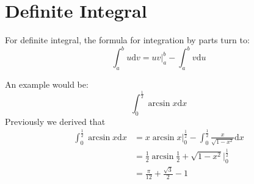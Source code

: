 \documentclass{article}
\numberwithin{equation}{section}
\begin{document}
\newpage
\section{Definite Integral}
For definite integral, the formula for integration by parts turn to:
\[
\int_{a}^{b} u\mathrm{d}v = uv \Big|_a^b - \int_{a}^{b} v\mathrm{d}u
\]

An example would be:
\[
\int_{0}^{\frac{1}{2}} \arcsin x \mathrm{d}x
\]
Previously we derived that
\begin{align*}
    \int_{0}^{\frac{1}{2}} \arcsin x \mathrm{d}x &= x\arcsin x \Big|_0^{\frac{1}{2}}- \int_{0}^{\frac{1}{2}} \frac{x}{\sqrt{1-x^2}} \mathrm{d}x\\
    &= \frac{1}{2} \arcsin \frac{1}{2} + \sqrt{1-x^2} \Big|_{0}^{\frac{1}{2}}\\
    &= \frac{\pi}{12} + \frac{\sqrt{3}}{2} - 1
\end{align*}
\end{document}
